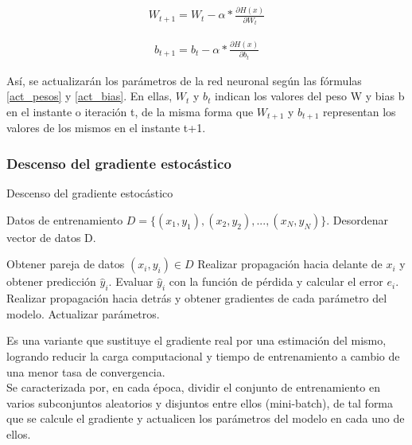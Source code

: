 \begin{gather}
	W_{t+1} = W_{t} - \alpha * \frac{\partial H(x)}{\partial W_{t}} 
	\label{act_pesos}
\end{gather}

\begin{gather}
	b_{t+1} = b_{t} - \alpha * \frac{\partial H(x)}{\partial b_{t}}
	\label{act_bias}
\end{gather}


Así, se actualizarán los parámetros de la red neuronal según las fórmulas \ref{act_pesos} y \ref{act_bias}. En ellas, $W_t$ y $b_t$ indican los valores del peso W y bias b en el instante o iteración t, de la misma forma que $W_{t+1}$ y $b_{t+1}$ representan los valores de los mismos en el instante t+1. \cite{SGD_act_params}

\subsubsection{Descenso del gradiente estocástico}

\begin{algorithm}[H]
	\caption{Descenso del gradiente estocástico \cite{SGD_3}} 
	\begin{algorithmic}
		\State Datos de entrenamiento $D=\{(x_1, y_1), (x_2, y_2), ..., (x_N, y_N)\}$.
			\State Desordenar vector de datos D.
			
				\State Obtener pareja de datos $(x_i, y_i) \in D$
				\State Realizar propagación hacia delante de $x_i$ y obtener predicción $\hat{y}_i$.
				\State Evaluar $\hat{y}_i$ con la función de pérdida y calcular el error $e_i$.
				\State Realizar propagación hacia detrás y obtener gradientes 
				\State      de cada parámetro del modelo.
				\State Actualizar parámetros.
			\EndFor
		\EndFor
	\end{algorithmic}
\end{algorithm}

Es una variante que sustituye el gradiente real por una estimación del mismo, logrando reducir la carga computacional y tiempo de entrenamiento a cambio de una menor tasa de convergencia. \cite{sgd_stocastico} \cite{sgd_stocastico_1} \\
Se caracterizada por, en cada época, dividir el conjunto de entrenamiento en varios subconjuntos aleatorios y disjuntos entre ellos (mini-batch), de tal forma que se calcule el gradiente y actualicen los parámetros del modelo en cada uno de ellos. \cite{sgd_stocastico} \\

